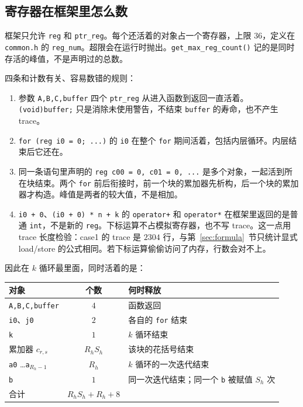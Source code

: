 \documentclass[11pt,a4paper,fontset=fandol]{ctexart}
\newcommand{\code}[1]{\texttt{#1}}
\begin{document}
\subsection{寄存器在框架里怎么数}
\label{sec:regs}

框架只允许 \code{reg} 和 \code{ptr\_reg}。每个还活着的对象占一个寄存器，上限 $36$，定义在 \code{common.h} 的 \code{reg\_num}。超限会在运行时抛出。\code{get\_max\_reg\_count()} 记的是同时存活的峰值，不是声明过的总数。

四条和计数有关、容易数错的规则：

\begin{enumerate}
  \item 参数 \code{A,B,C,buffer} 四个 \code{ptr\_reg} 从进入函数到返回一直活着。\code{(void)buffer;} 只是消除未使用警告，不结束 \code{buffer} 的寿命，也不产生 trace。
  \item \code{for (reg i0 = 0; ...)} 的 \code{i0} 在整个 \code{for} 期间活着，包括内层循环。内层结束后它还在。
  \item 同一条语句里声明的 \code{reg c00 = 0, c01 = 0, ...} 是多个对象，一起活到所在块结束。两个 \code{for} 前后衔接时，前一个块的累加器先析构，后一个块的累加器才构造。峰值是两者的较大值，不是相加。
  \item \code{i0 + 0}、\code{(i0 + 0) * n + k} 的 \code{operator+} 和 \code{operator*} 在框架里返回的是普通 \code{int}，不是新的 \code{reg}。下标运算不占模拟寄存器，也不写 trace。这一点用 trace 长度检验：case1 的 trace 是 $2304$ 行，与第~\ref{sec:formula}~节只统计显式 load/store 的公式相同。若下标运算偷偷访问了内存，行数会对不上。
\end{enumerate}

因此在 $k$ 循环最里面，同时活着的是：

\begin{center}
\begin{tabular}{@{}lcl@{}}
\toprule
对象 & 个数 & 何时释放\\
\midrule
\code{A,B,C,buffer} & $4$ & 函数返回\\
\code{i0}、\code{j0} & $2$ & 各自的 \code{for} 结束\\
\code{k} & $1$ & $k$ 循环结束\\
累加器 $c_{r,s}$ & $R_h S_h$ & 该块的花括号结束\\
\code{a0} \ldots \code{a}$_{R_h-1}$ & $R_h$ & $k$ 循环的一次迭代结束\\
\code{b} & $1$ & 同一次迭代结束；同一个 \code{b} 被赋值 $S_h$ 次\\
\midrule
合计 & $R_h S_h+R_h+8$ & \\
\bottomrule
\end{tabular}
\end{center}
\end{document}
